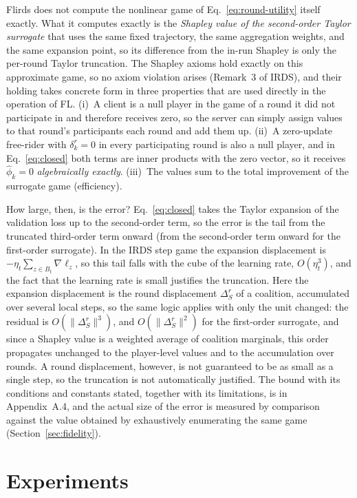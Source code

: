 \documentclass[letterpaper]{article} %
\theoremstyle{definition} %
\begin{document}
Flirds does not compute the nonlinear game of Eq.~\eqref{eq:round-utility}
itself exactly. What it computes exactly is the \emph{Shapley value of the
second-order Taylor surrogate} that uses the same fixed trajectory, the same
aggregation weights, and the same expansion point, so its difference from the
in-run Shapley is only the per-round Taylor truncation. The Shapley axioms
hold exactly on this approximate game, so no axiom violation arises
(Remark~3 of IRDS), and their holding takes concrete form in three properties
that are used directly in the operation of FL. (i)~A client is a null player
in the game of a round it did not participate in and therefore receives zero,
so the server can simply assign values to that round's participants each
round and add them up. (ii)~A zero-update free-rider with $\delta_k^r = 0$ in
every participating round is also a null player, and in
Eq.~\eqref{eq:closed} both terms are inner products with the zero vector, so
it receives $\hat\phi_k = 0$ \emph{algebraically exactly}. (iii)~The values
sum to the total improvement of the surrogate game (efficiency).

How large, then, is the error? Eq.~\eqref{eq:closed} takes the Taylor
expansion of the validation loss up to the second-order term, so the error is
the tail from the truncated third-order term onward (from the second-order
term onward for the first-order surrogate). In the IRDS step game the
expansion displacement is $-\eta_t\sum_{z\in B_t}\nabla\ell_z$, so this tail
falls with the cube of the learning rate, $O(\eta_t^3)$, and the fact that the
learning rate is small justifies the truncation. Here the expansion
displacement is the round displacement $\Delta_S^r$ of a coalition,
accumulated over several local steps, so the same logic applies with only the
unit changed: the residual is $O(\|\Delta_S^r\|^3)$, and
$O(\|\Delta_S^r\|^2)$ for the first-order surrogate, and since a Shapley value
is a weighted average of coalition marginals, this order propagates unchanged
to the player-level values and to the accumulation over rounds. A round
displacement, however, is not guaranteed to be as small as a single step, so
the truncation is not automatically justified. The bound with its conditions
and constants stated, together with its limitations, is in Appendix~A.4, and
the actual size of the error is measured by comparison against the value
obtained by exhaustively enumerating the same game
(Section~\ref{sec:fidelity}).

\section{Experiments}
\label{sec:experiments}
\end{document}
